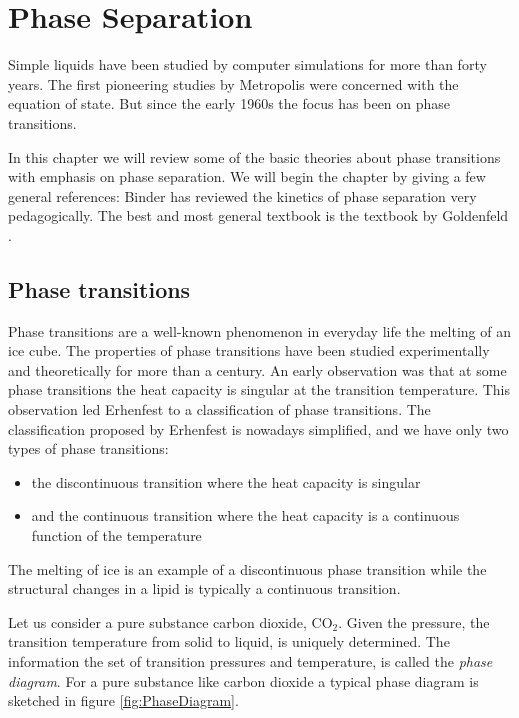 
\chapter{Phase Separation}
\label{chap:PhaseSep}

Simple liquids have been studied by computer simulations for more than
forty years. The first pioneering studies by \eg Metropolis \etal
\cite{Metropolis53} were concerned with
the equation of state. But since the early 1960s the focus has been on
phase transitions.

In this chapter we will review some of the basic theories about phase
transitions with emphasis on phase separation. We will begin the
chapter by giving a few general references: Binder \cite{Binder} has
reviewed the kinetics of phase separation very pedagogically.
The best and most general textbook is the
textbook by Goldenfeld \cite{Goldenfeld92}.


\section{Phase transitions}
\label{sect:PhaseTrans}
Phase transitions are a well-known phenomenon in everyday life \eg the
melting of an ice cube. The properties of phase transitions have been
studied experimentally and theoretically for more than a century. An
early observation was that at some phase transitions the heat capacity
is singular at the transition temperature. This observation led
Erhenfest to a classification of phase transitions. The classification
proposed by Erhenfest is nowadays simplified, and we have only two
types of phase transitions: 

\begin{itemize}
  \item the discontinuous transition where the heat capacity is singular
  \item and the continuous transition where the heat capacity is
  a continuous function of the temperature
\end{itemize}

The melting of ice is an example of a discontinuous phase transition
while the structural changes in a lipid is typically a continuous
transition. 

Let us consider a pure substance \eg carbon dioxide,
$\mathrm{CO}_2$. Given the pressure, the transition temperature from
solid to liquid, is uniquely determined. The information \ie the
set of transition pressures and temperature, is called the
\textit{phase diagram}. For a pure substance like carbon dioxide a
typical phase diagram is sketched in figure \ref{fig:PhaseDiagram}.


